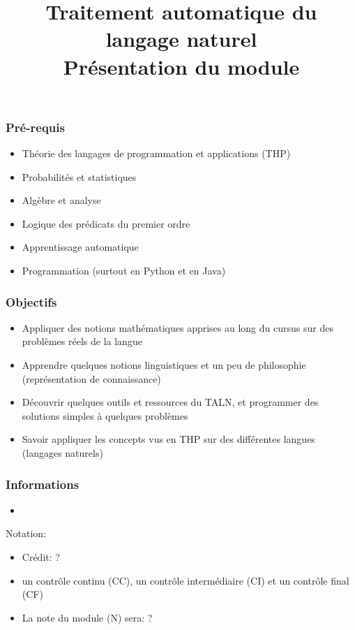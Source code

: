 \documentclass{beamer}
\title[TALN : Présentation] %
{Traitement automatique du langage naturel\\Présentation du module}
\begin{document}
\begin{frame}
\frametitle{Pré-requis}

\begin{itemize}
	\item Théorie des langages de programmation et applications (THP)
	\item Probabilités et statistiques
	\item Algèbre et analyse 
	\item Logique des prédicats du premier ordre
	\item Apprentissage automatique 
	\item Programmation (surtout en Python et en Java)
\end{itemize}

\end{frame}


\begin{frame}
\frametitle{Objectifs}

\begin{itemize}
	\item Appliquer des notions mathématiques apprises au long du cursus sur des problèmes réels de la langue 
	\item Apprendre quelques notions linguistiques et un peu de philosophie (représentation de connaissance) 
	\item Découvrir quelques outils et ressources du TALN, et programmer des solutions simples à quelques problèmes
	\item Savoir appliquer les concepts vus en THP sur des différentes langues (langages naturels)
\end{itemize}

\end{frame}


\begin{frame}
\frametitle{Informations}

\begin{itemize}
	\item 
\end{itemize}

Notation:
\begin{itemize}
	\item Crédit: ?
	\item un contrôle continu (CC), un contrôle intermédiaire (CI) et un contrôle final (CF)
	\item La note du module (N) sera: ?
\end{itemize}

\end{frame}
\end{document}
